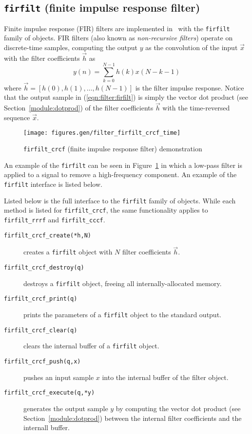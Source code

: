 \subsection{{\tt firfilt} (finite impulse response filter)}
\label{module:filter:firfilt}
Finite impulse response (FIR) filters are implemented in \liquid\ with
the {\tt firfilt} family of objects.
FIR filters (also known as {\em non-recursive filters}) operate on
discrete-time samples, computing the output $y$ as the convolution of
the input $\vec{x}$ with the filter coefficients $\vec{h}$ as
%
\begin{equation}
\label{eqn:filter:firfilt}
    y(n) = \sum_{k=0}^{N-1}{ h(k) x(N-k-1) }
\end{equation}
%
where $\vec{h} = [h(0),h(1),\ldots,h(N-1)]$
is the filter impulse response.
Notice that the output sample in (\ref{eqn:filter:firfilt})
is simply the vector dot product (see Section~\ref{module:dotprod})
of the filter coefficients $\vec{h}$ with the time-reversed sequence
$\vec{x}$.
%
\begin{figure}
\centering
  \texttt{[image: figures.gen/filter\_firfilt\_crcf\_time]}
\caption{{\tt firfilt\_crcf} (finite impulse response filter) demonstration}
\label{fig:module:filter:firfilt_crcf}
\end{figure}
%
An example of the {\tt firfilt} can be seen in
Figure~\ref{fig:module:filter:firfilt_crcf}
in which a low-pass filter is applied to a signal to remove a
high-frequency component.
%
An example of the {\tt firfilt} interface is listed below.
%

%
Listed below is the full interface to the {\tt firfilt} family of
objects.
While each method is listed for {\tt firfilt\_crcf}, the same
functionality applies to {\tt firfilt\_rrrf} and {\tt firfilt\_cccf}.
%
\begin{description}
\item[{\tt firfilt\_crcf\_create(*h,N)}]
    creates a {\tt firfilt} object with $N$ filter coefficients
    $\vec{h}$.
\item[{\tt firfilt\_crcf\_destroy(q)}]
    destroys a {\tt firfilt} object, freeing all internally-allocated
    memory.
\item[{\tt firfilt\_crcf\_print(q)}]
    prints the parameters of a {\tt firfilt} object to the standard
    output.
\item[{\tt firfilt\_crcf\_clear(q)}]
    clears the internal buffer of a {\tt firfilt} object.
\item[{\tt firfilt\_crcf\_push(q,x)}]
    pushes an input sample $x$ into the internal buffer of the filter
    object.
\item[{\tt firfilt\_crcf\_execute(q,*y)}]
    generates the output sample $y$ by computing the vector dot product
    (see Section~\ref{module:dotprod})
    between the internal filter coefficients and the internall buffer.
\end{description}
%



